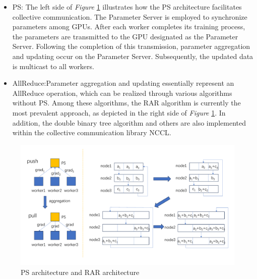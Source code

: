 \documentclass[conference]{IEEEtran}
\begin{document}
\begin{itemize}
	
	\begin{itemize}
		\item PS: The left side of \emph{Figure} \ref{fig:picture5} illustrates how the PS architecture facilitates collective communication. The Parameter Server is employed to synchronize parameters among GPUs. After each worker completes its training process, the parameters are transmitted to the GPU designated as the Parameter Server. Following the completion of this transmission, parameter aggregation and updating occur on the Parameter Server. Subsequently, the updated data is multicast to all workers.
		
		\item AllReduce:Parameter aggregation and updating essentially represent an AllReduce operation, which can be realized through various algorithms without PS. Among these algorithms, the RAR algorithm is currently the most prevalent approach, as depicted in the right side of \emph{Figure} \ref{fig:picture5}. In addition, the double binary tree \cite{Tree} algorithm and others are also implemented within the collective communication library NCCL.
	\end{itemize}
	
	\begin{figure}
		\centering
		\includegraphics[width=1\linewidth]{figure/picture5}
		\caption{PS architecture and RAR architecture}
		\label{fig:picture5}
	\end{figure}
	

\end{itemize}
\end{document}
